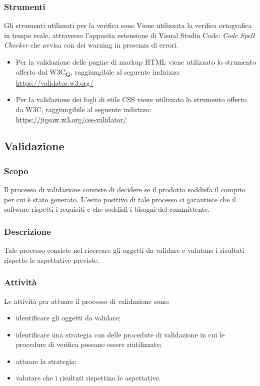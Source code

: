 \subsubsection{Strumenti}
Gli strumenti utilizzati per la verifica sono
Viene utilizzata la verifica ortografica in tempo reale, attraverso l'apposita estensione di Visual Studio Code: \textit{Code Spell Checker} che avvisa con dei warning in presenza di errori.

\begin{itemize}
    \item Per la validazione delle pagine di markup HTML viene utilizzato lo strumento offerto dal W3C\textsubscript{\textbf{G}}, raggiungibile al seguente indirizzo:\\
          \href{https://validator.w3.org/}{https://validator.w3.org/}
    \item Per la validazione dei fogli di stile CSS viene utilizzato lo strumento offerto da W3C, raggiungibile al seguente indirizzo:\\
          \href{https://jigsaw.w3.org/css-validator/}{https://jigsaw.w3.org/css-validator/}

\end{itemize}
\subsection{Validazione}
\subsubsection{Scopo}
Il processo di validazione consiste di decidere se il prodotto soddisfa il compito per cui è stato generato. L'esito positivo di tale processo ci garantisce che il software rispetti i requisiti e che soddisfi i bisogni del committente.
\subsubsection{Descrizione}
Tale processo consiste nel ricercare gli oggetti da validare e valutane i risultati rispetto le aspettative previste.
\subsubsection{Attività}
Le attività per attuare il processo di validazione sono:
\begin{itemize}
    \item identificare gli oggetti da validare;
    \item identificare una strategia con delle procedute di validazione in cui le procedure di verifica possano essere riutilizzate;
    \item attuare la strategia;
    \item valutare che i risultati rispettino le aspettative.
\end{itemize}
